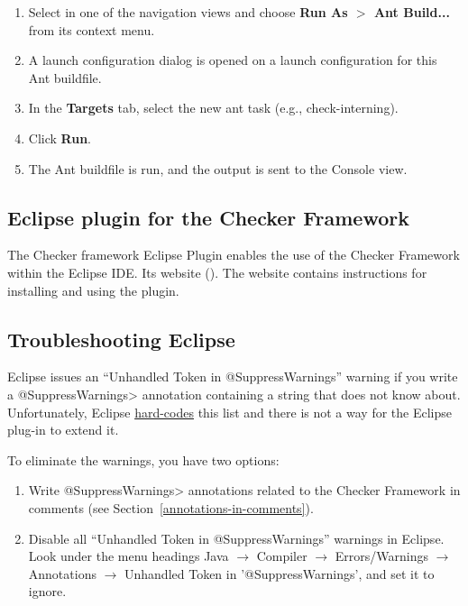 \begin{enumerate}

\item
  Select  in one of the navigation views and choose
  {\bf Run As $>$ Ant Build...} from its context menu.

\item
  A launch configuration dialog is opened on a launch configuration
  for this Ant buildfile.

\item
  In the {\bf Targets} tab, select the new ant task (e.g., check-interning).

\item
  Click {\bf Run}.

\item
  The Ant buildfile is run, and the output is sent to the Console view.

\end{enumerate}


\label{eclipse-plug-in}         %
\subsection{Eclipse plugin for the Checker Framework\label{eclipse-plugin}}

The Checker framework Eclipse Plugin enables the use of the Checker
Framework within the Eclipse IDE\@.
Its website ().
The website contains instructions for installing and using the plugin.


\subsection{Troubleshooting Eclipse\label{eclipse-troubleshooting}}

Eclipse issues an ``Unhandled Token in @SuppressWarnings'' warning if you
write a \<@SuppressWarnings> annotation containing a string that does not
know about.  Unfortunately, Eclipse
\href{https://bugs.eclipse.org/bugs/show_bug.cgi?id=122475}{hard-codes}
this list and there is not a way for the Eclipse plug-in to extend it.

To eliminate the warnings, you have two options:

\begin{enumerate}
\item
Write \<@SuppressWarnings> annotations related to the Checker Framework in
comments (see Section~\ref{annotations-in-comments}).
\item
  Disable all ``Unhandled Token in @SuppressWarnings'' warnings in Eclipse.
  Look under the menu headings Java $\rightarrow$ Compiler $\rightarrow$ Errors/Warnings $\rightarrow$ Annotations $\rightarrow$ Unhandled Token in '@SuppressWarnings', and set it to ignore.
\end{enumerate}


